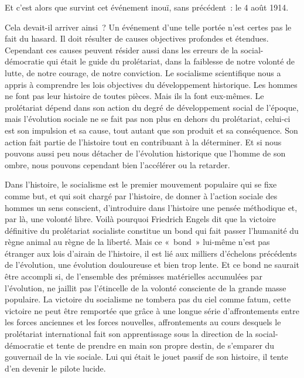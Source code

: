 \documentclass[french,twoside]{book} %
\begin{document}
\noindent Et c’est alors que survint cet événement inouï, sans précédent : le 4 août 1914.\par
Cela devait-il arriver ainsi ? Un événement d’une telle portée n’est certes pas le fait du hasard. Il doit résulter de causes objectives profondes et étendues. Cependant ces causes peuvent résider aussi dans les erreurs de la social-démocratie qui était le guide du prolétariat, dans la faiblesse de notre volonté de lutte, de notre courage, de notre conviction. Le socialisme scientifique nous a appris à comprendre les lois objectives du développement historique. Les hommes ne font pas leur histoire de toutes pièces. Mais ils la font eux-mêmes. Le prolétariat dépend dans son action du degré de développement social de l’époque, mais l’évolution sociale ne se fait pas non plus en dehors du prolétariat, celui-ci est son impulsion et sa cause, tout autant que son produit et sa conséquence. Son action fait partie de l’histoire tout en contribuant à la déterminer. Et si nous pouvons aussi peu nous détacher de l’évolution historique que l’homme de son ombre, nous pouvons cependant bien l’accélérer ou la retarder.\par
Dans l’histoire, le socialisme est le premier mouvement populaire qui se fixe comme but, et qui soit chargé par l’histoire, de donner à l’action sociale des hommes un sens conscient, d’introduire dans l’histoire une pensée méthodique et, par là, une volonté libre. Voilà pourquoi Friedrich Engels dit que la victoire définitive du prolétariat socialiste constitue un bond qui fait passer l’humanité du règne animal au règne de la liberté. Mais ce « bond » lui-même n’est pas étranger aux lois d’airain de l’histoire, il est lié aux milliers d’échelons précédents de l’évolution, une évolution douloureuse et bien trop lente. Et ce bond ne saurait être accompli si, de l’ensemble des prémisses matérielles accumulées par l’évolution, ne jaillit pas l’étincelle de la volonté consciente de la grande masse populaire. La victoire du socialisme ne tombera pas du ciel comme fatum, cette victoire ne peut être remportée que grâce à une longue série d’affrontements entre les forces anciennes et les forces nouvelles, affrontements au cours desquels le prolétariat international fait son apprentissage sous la direction de la social-démocratie et tente de prendre en main son propre destin, de s’emparer du gouvernail de la vie sociale. Lui qui était le jouet passif de son histoire, il tente d’en devenir le pilote lucide.\par
\end{document}
